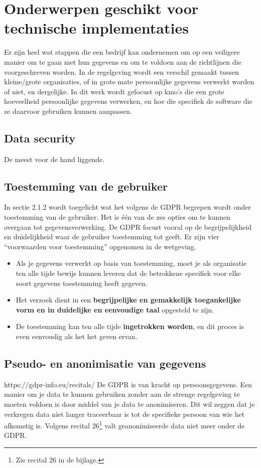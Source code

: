 \section{{Onderwerpen geschikt voor technische implementaties}}

Er zijn heel wat stappen die een bedrijf kan ondernemen om op een veiligere manier om te gaan met hun gegevens en om te voldoen aan de richtlijnen die voorgeschreven worden. 
In de regelgeving wordt een verschil gemaakt tussen kleine/grote organisaties, of in grote mate persoonlijke gegevens verwerkt worden of niet, en dergelijke. In dit werk wordt gefocust op kmo's die een grote hoeveelheid persoonlijke gegevens verwerken, en hoe die specifiek de software die ze daarvoor gebruiken kunnen aanpassen. 


\subsection{Data security}
De meest voor de hand liggende. 

\subsection{Toestemming van de gebruiker}
In sectie 2.1.2 wordt toegelicht wat het volgens de GDPR begrepen wordt onder toestemming van de gebruiker. Het is één van de zes opties om te kunnen overgaan tot gegevensverwerking. De GDPR focust vooral op de begrijpelijkheid en duidelijkheid waar de gebruiker toestemming tot geeft. Er zijn vier “voorwaarden voor toestemming” opgenomen in de wetgeving. 
\begin{itemize}
    \item  Als je gegevens verwerkt op basis van toestemming, moet je als organisatie ten alle tijde bewijs kunnen leveren dat de betrokkene specifiek voor elke soort gegevens toestemming heeft gegeven. 
    \item  Het verzoek dient in een \textbf{begrijpelijke en gemakkelijk toegankelijke vorm en in duidelijke en eenvoudige taal} opgesteld te zijn. 
    \item  
    De toestemming kan ten alle tijde \textbf{ingetrokken worden}, en dit proces is even eenvoudig als het het geven ervan. 
\end{itemize}


 

\subsection{Pseudo- en anonimisatie van gegevens}
https://gdpr-info.eu/recitals/
De GDPR is van kracht op persoonsgegevens. Een manier om je data te kunnen gebruiken zonder aan de strenge regelgeving te moeten voldoen is door middel van je data te anonimiseren. Dit wil zeggen dat je verkregen data niet langer traceerbaar is tot de specifieke persoon van wie het afkomstig is. Volgens recital 26\footnote{Zie recital 26 in de bijlage.} valt geanonimiseerde data niet meer onder de GDPR. 

